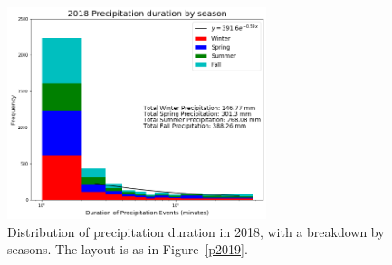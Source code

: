 \documentclass[11pt]{report}
\begin{document}
\begin{figure}[b]
  \centering
  \includegraphics[width=0.675\textwidth]{Figures/precip_2018.png}
  \caption[Precipitation histogram for 2018 broken down by season]{\label{p2018}
    Distribution of precipitation duration in 2018, with a breakdown
    by seasons. The layout is as in Figure~\ref{p2019}.}
\end{figure}
	
\end{document}
